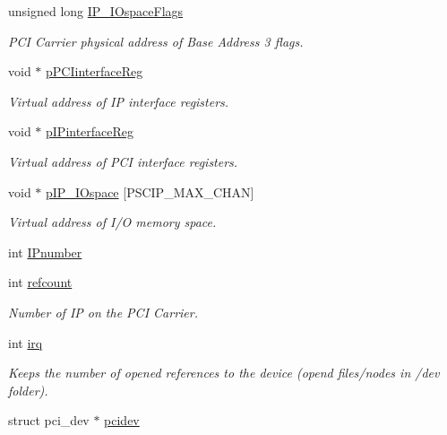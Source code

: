 \begin{CompactItemize}
unsigned long \hyperlink{structnpscip___dev_8dfde8b4c64adcd6c7f67d64dfa2c4eb}{IP\_\-IOspaceFlags}
\begin{CompactList}\small\item\em PCI Carrier physical address of Base Address 3 flags. \item\end{CompactList}\item 
void $\ast$ \hyperlink{structnpscip___dev_dbe8eac260892a669589f3ca732c4ad7}{pPCIinterfaceReg}
\begin{CompactList}\small\item\em Virtual address of IP interface registers. \item\end{CompactList}\item 
void $\ast$ \hyperlink{structnpscip___dev_55e32b14b74a1a31efa915f3ee30da2c}{pIPinterfaceReg}
\begin{CompactList}\small\item\em Virtual address of PCI interface registers. \item\end{CompactList}\item 
void $\ast$ \hyperlink{structnpscip___dev_dc0a68164f555ddc4b5de6d4cf0bf0e9}{pIP\_\-IOspace} \mbox{[}PSCIP\_\-MAX\_\-CHAN\mbox{]}
\begin{CompactList}\small\item\em Virtual address of I/O memory space. \item\end{CompactList}\item 
int \hyperlink{structnpscip___dev_6bf8d25b955da3e4560bffb7737cd2f5}{IPnumber}
\item 
int \hyperlink{structnpscip___dev_94183aef5d449f3f07669641aed0b6dd}{refcount}
\begin{CompactList}\small\item\em Number of IP on the PCI Carrier. \item\end{CompactList}\item 
int \hyperlink{structnpscip___dev_9e516ab0b05d5588434b93ecbf9db04d}{irq}
\begin{CompactList}\small\item\em Keeps the number of opened references to the device (opend files/nodes in /dev folder). \item\end{CompactList}\item 
struct pci\_\-dev $\ast$ \hyperlink{structnpscip___dev_d017ea6be67a911fa7e0227048f42112}{pcidev}

\end{CompactItemize}
